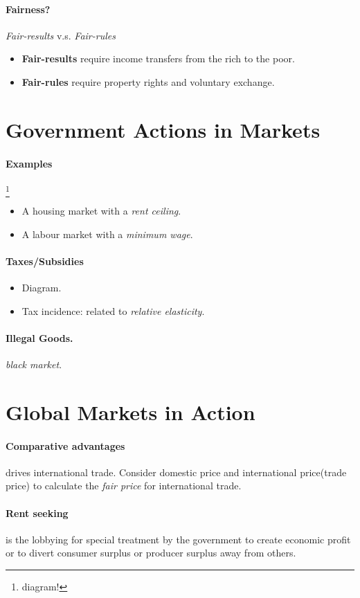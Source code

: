 \documentclass{article}
\begin{document}
	\paragraph{Fairness?} \emph{Fair-results} v.s. \emph{Fair-rules}
	\begin{itemize}
		\item \textbf{Fair-results} require income transfers from the rich to the poor.
		\item \textbf{Fair-rules} require property rights and voluntary exchange.
	\end{itemize}
	\section{Government Actions in Markets}
	\paragraph{Examples}\footnote{diagram!}
	\begin{itemize}
		\item A housing market with a \emph{rent ceiling}.
		\item A labour market with a \emph{minimum wage}.
	\end{itemize}
	\paragraph{Taxes/Subsidies}
	\begin{itemize}
		\item Diagram.
		\item Tax incidence: related to \emph{relative elasticity}.
	\end{itemize}
	\paragraph{Illegal Goods.} \emph{black market}.
	\section{Global Markets in Action}
	\paragraph{Comparative advantages} drives international trade. Consider domestic price and international price(trade price) to calculate the \emph{fair price} for international trade.
	\paragraph{Rent seeking} is the lobbying for special treatment by the government to create economic profit or to divert consumer surplus or producer surplus away from others.
\end{document}
